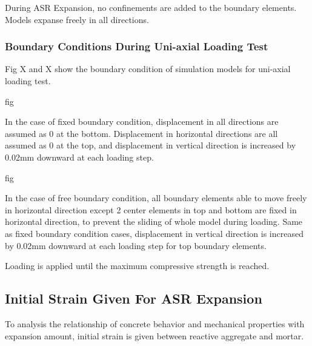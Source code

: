 During ASR Expansion, no confinements are added to the boundary elements. Models expanse freely in all directions.

\subsubsection{Boundary Conditions During Uni-axial Loading Test}

Fig X and X show the boundary condition of simulation models for uni-axial loading test.

fig

In the case of fixed boundary condition, displacement in all directions are assumed as 0 at the bottom. Displacement in horizontal directions are all assumed as 0 at the top, and displacement in vertical direction is increased by 0.02mm downward at each loading step.

fig

In the case of free boundary condition, all boundary elements able to move freely in horizontal direction except 2 center elements in top and bottom are fixed in horizontal direction, to prevent the sliding of whole model during loading. Same as fixed boundary condition cases, displacement in vertical direction is increased by 0.02mm downward at each loading step for top boundary elements.

Loading is applied until the maximum compressive strength is reached.

\subsection{Initial Strain Given For ASR Expansion}

To analysis the relationship of concrete behavior and mechanical properties with expansion amount, initial strain is given between reactive aggregate and mortar.

